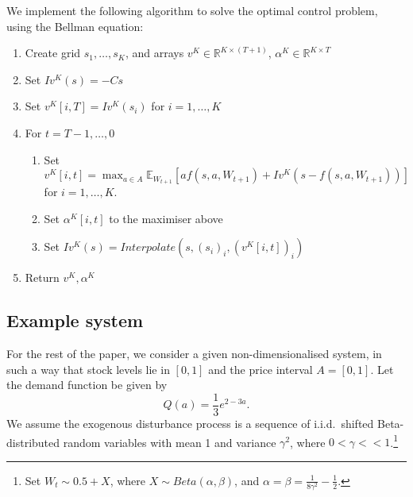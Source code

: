 \documentclass[main.tex]{subfiles}
\begin{document}
We implement the following algorithm to solve the optimal control
problem, using the Bellman equation:
\begin{enumerate}
\item Create grid $s_1,\dots,s_K$, and arrays $v^K\in\mathbb R^{K\times(T+1)}$,
  $\alpha^K\in\mathbb R^{K\times T}$
\item Set $Iv^K(s)=-Cs$
\item Set $v^K[i,T]=Iv^K(s_i)$ for $i=1,\dots, K$
\item For $t = T-1,\dots,0$
  \begin{enumerate}
  \item Set $\displaystyle v^K[i,t]=\max_{a\in A}\mathbb E_{W_{t+1}}\left[ af(s,a,W_{t+1})
      +Iv^K(s-f(s,a,W_{t+1}))\right]$\\ for $i=1,\dots,K$.
  \item Set $\alpha^K[i,t]$ to the maximiser above
  \item Set $Iv^K(s) = Interpolate(s, {(s_i)}_i,{(v^K[i,t])}_i)$
  \end{enumerate}
\item Return $v^K,\alpha^K$
\end{enumerate}

\subsection{Example system}\label{sec:bellman_example_markdown}
For the rest of the paper, we consider a given non-dimensionalised
system, in such a way that stock levels lie in $[0,1]$ and the price
interval $A=[0,1]$.
Let the demand function be given by
\begin{equation}
  Q(a)=\frac{1}{3}e^{2-3a}.
\end{equation}
We assume the exogenous disturbance process is a sequence of
i.i.d.~shifted Beta-distributed random variables with mean 1 and variance
$\gamma^2$, where $0<\gamma<<1$.\footnote{Set $W_t\sim 0.5+X$, where
  $X\sim Beta(\alpha,\beta)$, and
  $\alpha=\beta=\frac{1}{8\gamma^2}-\frac{1}{2}$.}
\end{document}
